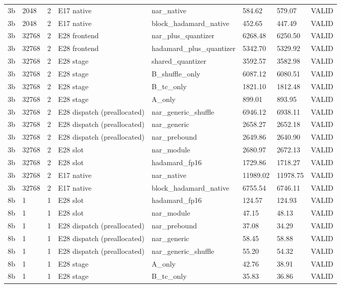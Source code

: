 {\begin{longtable}{llllllll}
3b & 2048 & 2 & E17 native & nar\_native & 584.62 & 579.07 & VALID \\
3b & 2048 & 2 & E17 native & block\_hadamard\_native & 452.65 & 447.49 & VALID \\
3b & 32768 & 2 & E28 frontend & nar\_plus\_quantizer & 6268.48 & 6250.50 & VALID \\
3b & 32768 & 2 & E28 frontend & hadamard\_plus\_quantizer & 5342.70 & 5329.92 & VALID \\
3b & 32768 & 2 & E28 stage & shared\_quantizer & 3592.57 & 3582.98 & VALID \\
3b & 32768 & 2 & E28 stage & B\_shuffle\_only & 6087.12 & 6080.51 & VALID \\
3b & 32768 & 2 & E28 stage & B\_tc\_only & 1821.10 & 1812.48 & VALID \\
3b & 32768 & 2 & E28 stage & A\_only & 899.01 & 893.95 & VALID \\
3b & 32768 & 2 & E28 dispatch (preallocated) & nar\_generic\_shuffle & 6946.12 & 6938.11 & VALID \\
3b & 32768 & 2 & E28 dispatch (preallocated) & nar\_generic & 2658.27 & 2652.18 & VALID \\
3b & 32768 & 2 & E28 dispatch (preallocated) & nar\_prebound & 2649.86 & 2640.90 & VALID \\
3b & 32768 & 2 & E28 slot & nar\_module & 2680.97 & 2672.13 & VALID \\
3b & 32768 & 2 & E28 slot & hadamard\_fp16 & 1729.86 & 1718.27 & VALID \\
3b & 32768 & 2 & E17 native & nar\_native & 11989.02 & 11978.75 & VALID \\
3b & 32768 & 2 & E17 native & block\_hadamard\_native & 6755.54 & 6746.11 & VALID \\
8b & 1 & 1 & E28 slot & hadamard\_fp16 & 124.57 & 124.93 & VALID \\
8b & 1 & 1 & E28 slot & nar\_module & 47.15 & 48.13 & VALID \\
8b & 1 & 1 & E28 dispatch (preallocated) & nar\_prebound & 37.08 & 34.29 & VALID \\
8b & 1 & 1 & E28 dispatch (preallocated) & nar\_generic & 58.45 & 58.88 & VALID \\
8b & 1 & 1 & E28 dispatch (preallocated) & nar\_generic\_shuffle & 55.20 & 54.32 & VALID \\
8b & 1 & 1 & E28 stage & A\_only & 42.76 & 38.91 & VALID \\
8b & 1 & 1 & E28 stage & B\_tc\_only & 35.83 & 36.86 & VALID \\

\end{longtable}}
